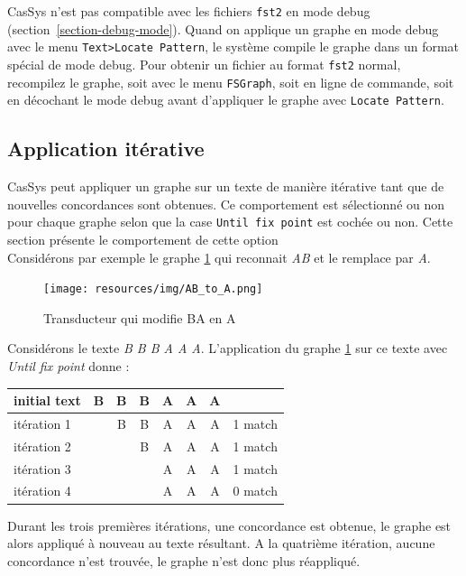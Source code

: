 \bigskip
\noindent CasSys n'est pas compatible avec les fichiers \verb+fst2+ en mode debug (section~\ref{section-debug-mode}).
Quand on applique un graphe en mode debug avec le menu \verb+Text>Locate Pattern+, le système
compile le graphe dans un format spécial de mode debug. Pour obtenir un fichier au format \verb+fst2+ normal,
recompilez le graphe, soit avec le menu \verb+FSGraph+, soit en ligne de commande, soit en décochant le mode
debug avant d'appliquer le graphe avec \verb+Locate Pattern+.

\subsection{Application itérative}
\label{sub:AppWhiCon}

CasSys peut appliquer un graphe sur un texte de manière itérative tant que de nouvelles concordances sont obtenues.
Ce comportement est sélectionné ou non pour chaque graphe selon que la case \verb+Until fix point+ est cochée ou non. Cette section présente le comportement de cette option\\

Considérons par exemple le graphe \ref{fig:AB->A} qui reconnait \emph{AB} et le remplace par \emph{A}.\\

\begin{figure}[!htbp]
  \centering
  \texttt{[image: resources/img/AB\_to\_A.png]}
  \caption{Transducteur qui modifie BA en A}
  \label{fig:AB->A}
\end{figure}

Considérons le texte \emph{B B B A A A}. L'application du graphe \ref{fig:AB->A} sur ce texte avec \emph{Until fix point}  donne :\\

\begin{tabular}{|l|cccccc|r|}
\hline
initial text  &B&B&B&A&A&A&\\
\hline
itération 1 & &B&B&A&A&A& 1 match\\
itération 2 & & &B&A&A&A& 1 match\\
itération 3 & & & &A&A&A& 1 match\\
itération 4 & & & &A&A&A& 0 match\\
\hline
\end{tabular}

\bigskip
Durant les trois premières itérations, une concordance est obtenue, le graphe
est alors appliqué à nouveau au texte résultant. A la quatrième itération, aucune
concordance n'est trouvée, le graphe n'est donc plus réappliqué.


